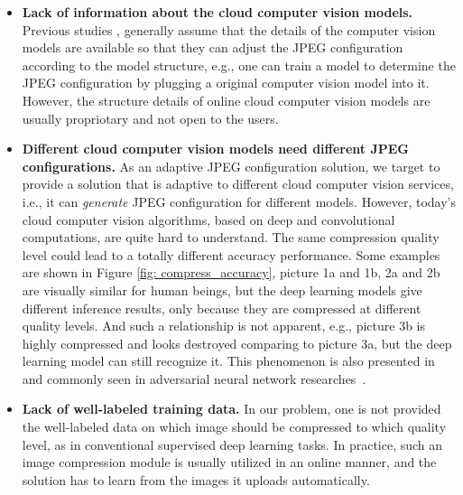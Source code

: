\begin{itemize}

\item \textbf{Lack of information about the cloud computer vision models.} Previous studies \cite{DeepN-JPEG,torfason2018towards,gueguen2018faster}, generally assume that the details of the computer vision models are available so that they can adjust the JPEG configuration according to the model structure, e.g., one can train a model to determine the JPEG configuration by plugging a original computer vision model into it. However, the structure details of online cloud computer vision models are usually propriotary and not open to the users. 

\item \textbf{Different cloud computer vision models need different JPEG configurations.} As an adaptive JPEG configuration solution, we target to provide a solution that is adaptive to different cloud computer vision services, i.e., it can \emph{generate} JPEG configuration for different models. However, today's cloud computer vision algorithms, based on deep and convolutional computations, are quite hard to understand. The same compression quality level could lead to a totally different accuracy performance. Some examples are shown in Figure \ref{fig: compress_accuracy}, picture 1a and 1b, 2a and 2b are visually similar for human beings, but the deep learning models give different inference results, only because they are compressed at different quality levels. And such a relationship is not apparent, e.g., picture 3b is highly compressed and looks destroyed comparing to picture 3a, but the deep learning model can still recognize it. This phenomenon is also presented in~\cite{delac2005effects} and commonly seen in adversarial neural network researches~\cite{yuan2019adversarial, evtimov2018robust}.

\item \textbf{Lack of well-labeled training data.} In our problem, one is not provided the well-labeled data on which image should be compressed to which quality level, as in conventional supervised deep learning tasks. In practice, such an image compression module is usually utilized in an online manner, and the solution has to learn from the images it uploads automatically. 
\end{itemize} 

